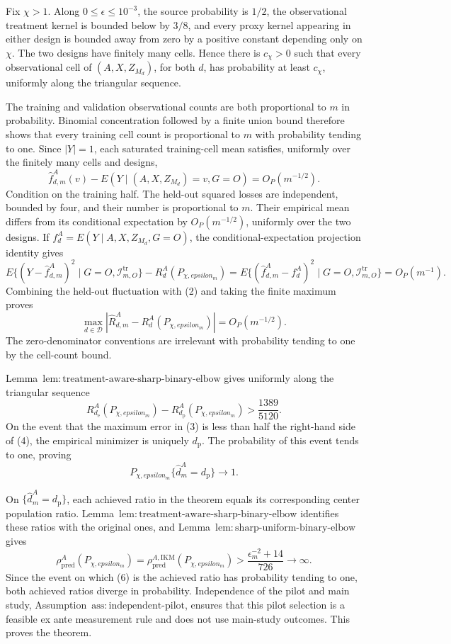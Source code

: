 Fix \(\chi>1\). Along \(0\le\epsilon\le10^{-3}\), the source probability is \(1/2\), the observational treatment kernel is bounded below by \(3/8\), and every proxy kernel appearing in either design is bounded away from zero by a positive constant depending only on \(\chi\). The two designs have finitely many cells. Hence there is \(c_\chi>0\) such that every observational cell of \((A,X,Z_{M_d})\), for both \(d\), has probability at least \(c_\chi\), uniformly along the triangular sequence.

The training and validation observational counts are both proportional to \(m\) in probability. Binomial concentration followed by a finite union bound therefore shows that every training cell count is proportional to \(m\) with probability tending to one. Since \(|Y|=1\), each saturated training-cell mean satisfies, uniformly over the finitely many cells and designs,
\[
 \widehat f_{d,m}^A(v)-E(Y\mid (A,X,Z_{M_d})=v,G=O)=O_P(m^{-1/2}). \tag{1}
\]
Condition on the training half. The held-out squared losses are independent, bounded by four, and their number is proportional to \(m\). Their empirical mean differs from its conditional expectation by \(O_P(m^{-1/2})\), uniformly over the two designs. If \(f_d^A=E(Y\mid A,X,Z_{M_d},G=O)\), the conditional-expectation projection identity gives
\[
 E\{(Y-\widehat f_{d,m}^A)^2\mid G=O,\mathcal I_{m,O}^{\mathrm{tr}}\}
 -R_d^A(P_{\chi,epsilon_m})
 =E\{(\widehat f_{d,m}^A-f_d^A)^2\mid G=O,\mathcal I_{m,O}^{\mathrm{tr}}\}
 =O_P(m^{-1}). \tag{2}
\]
Combining the held-out fluctuation with (2) and taking the finite maximum proves
\[
 \max_{d\in\mathcal D}|\widehat R_{d,m}^A-R_d^A(P_{\chi,epsilon_m})|
 =O_P(m^{-1/2}). \tag{3}
\]
The zero-denominator conventions are irrelevant with probability tending to one by the cell-count bound.

Lemma~\(\mathrm{lem{:}treatment\text{-}aware\text{-}sharp\text{-}binary\text{-}elbow}\) gives uniformly along the triangular sequence
\[
 R_{d_{\mathrm e}}^A(P_{\chi,epsilon_m})
 -R_{d_{\mathrm p}}^A(P_{\chi,epsilon_m})
 >\frac{1389}{5120}. \tag{4}
\]
On the event that the maximum error in (3) is less than half the right-hand side of (4), the empirical minimizer is uniquely \(d_{\mathrm p}\). The probability of this event tends to one, proving
\[
 P_{\chi,epsilon_m}\{\widehat d_m^A=d_{\mathrm p}\}\longrightarrow1. \tag{5}
\]

On \(\{\widehat d_m^A=d_{\mathrm p}\}\), each achieved ratio in the theorem equals its corresponding center population ratio. Lemma~\(\mathrm{lem{:}treatment\text{-}aware\text{-}sharp\text{-}binary\text{-}elbow}\) identifies these ratios with the original ones, and Lemma~\(\mathrm{lem{:}sharp\text{-}uniform\text{-}binary\text{-}elbow}\) gives
\[
 \rho_{\mathrm{pred}}^A(P_{\chi,epsilon_m})
 =\rho_{\mathrm{pred}}^{A,\mathrm{IKM}}(P_{\chi,epsilon_m})
 >\frac{\epsilon_m^{-2}+14}{726}\longrightarrow\infty. \tag{6}
\]
Since the event on which (6) is the achieved ratio has probability tending to one, both achieved ratios diverge in probability. Independence of the pilot and main study, Assumption~\(\mathrm{ass{:}independent\text{-}pilot}\), ensures that this pilot selection is a feasible ex ante measurement rule and does not use main-study outcomes. This proves the theorem.